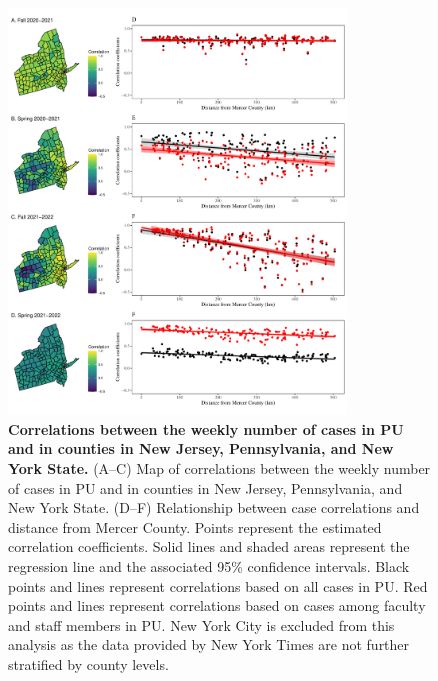 \documentclass[12pt]{article}
\begin{document}
\begin{figure}[!htp]
\includegraphics[width=0.8\textwidth]{../figure_princeton_new/figure_princeton_map_extended.pdf}
\caption{
\textbf{Correlations between the weekly number of cases in PU and in counties in New Jersey, Pennsylvania, and New York State.}
(A--C) Map of correlations between the weekly number of cases in PU and in counties in New Jersey, Pennsylvania, and New York State.
(D--F) Relationship between case correlations and distance from Mercer County.
Points represent the estimated correlation coefficients.
Solid lines and shaded areas represent the regression line and the associated 95\% confidence intervals.
Black points and lines represent correlations based on all cases in PU.
Red points and lines represent correlations based on cases among faculty and staff members in PU.
New York City is excluded from this analysis as the data provided by New York Times are not further stratified by county levels.
}
\end{figure}


\pagebreak
\end{document}
